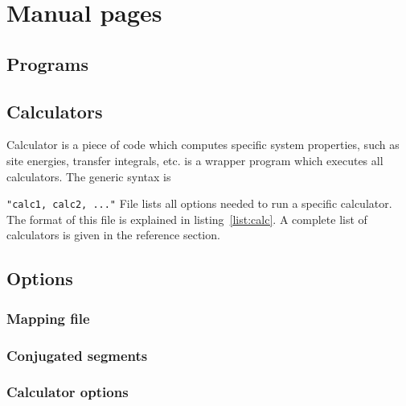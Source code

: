 \chapter{Manual pages}
%
%
\section{Programs}
\label{ref:programs}


\section{Calculators}
\label{ref:calculators}
\label{sec:calculators}

Calculator is a piece of code which computes specific system properties, such as site energies, transfer integrals, etc. \ctprun is a wrapper program which executes all calculators. The generic syntax is 

  \ctprun \exe \texttt{"calc1, calc2, ..."} \opt \xmloptions
\vskip 0.2cm
%
File \xmloptions lists all options needed to run a specific calculator. The format of this file is explained in listing~\ref{list:calc}. A complete list of calculators is given in the  reference section.
%



\vfill

\section{Options}
\label{ref:options}

\subsection{Mapping file}
{\small 

}
\vfill

\subsection{Conjugated segments}
{\small 

}
\vfill

\subsection{Calculator options}
{\small 

}
\vfill
